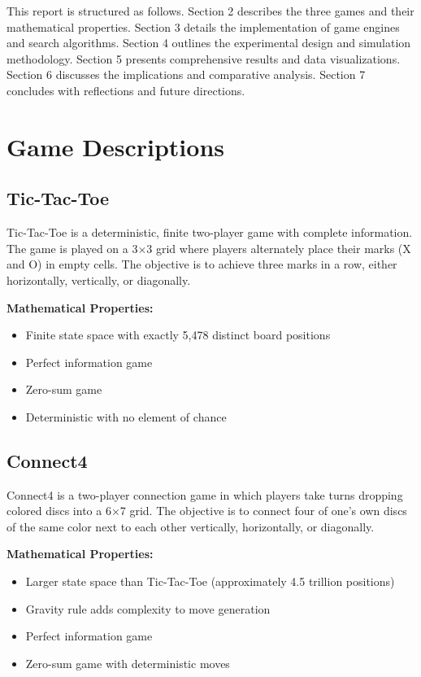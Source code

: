 \documentclass[12pt]{article}
\begin{document}
This report is structured as follows. Section 2 describes the three games and their mathematical properties. Section 3 details the implementation of game engines and search algorithms. Section 4 outlines the experimental design and simulation methodology. Section 5 presents comprehensive results and data visualizations. Section 6 discusses the implications and comparative analysis. Section 7 concludes with reflections and future directions.

\section{Game Descriptions}

\subsection{Tic-Tac-Toe}

Tic-Tac-Toe is a deterministic, finite two-player game with complete information. The game is played on a 3×3 grid where players alternately place their marks (X and O) in empty cells. The objective is to achieve three marks in a row, either horizontally, vertically, or diagonally.

\textbf{Mathematical Properties:}
\begin{itemize}
    \item Finite state space with exactly 5,478 distinct board positions
    \item Perfect information game
    \item Zero-sum game
    \item Deterministic with no element of chance
\end{itemize}

\subsection{Connect4}

Connect4 is a two-player connection game in which players take turns dropping colored discs into a 6×7 grid. The objective is to connect four of one's own discs of the same color next to each other vertically, horizontally, or diagonally.

\textbf{Mathematical Properties:}
\begin{itemize}
    \item Larger state space than Tic-Tac-Toe (approximately 4.5 trillion positions)
    \item Gravity rule adds complexity to move generation
    \item Perfect information game
    \item Zero-sum game with deterministic moves
\end{itemize}
\end{document}
